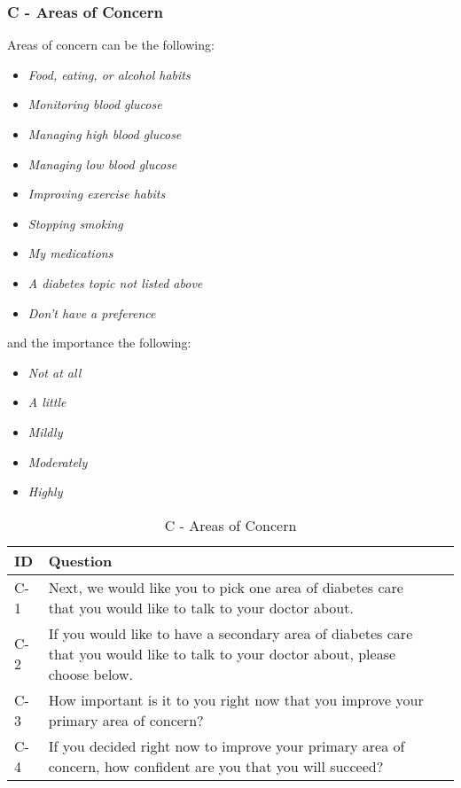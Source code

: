 \subsubsection{C - Areas of Concern}
Areas of concern can be the following:
\begin{itemize}
    \item \emph{Food, eating, or alcohol habits}
    \item \emph{Monitoring blood glucose}
    \item \emph{Managing high blood glucose}
    \item \emph{Managing low blood glucose}
    \item \emph{Improving exercise habits}
    \item \emph{Stopping smoking}
    \item \emph{My medications}
    \item \emph{A diabetes topic not listed above}
    \item \emph{Don't have a preference}
\end{itemize}
and the importance the following:
\begin{itemize}
    \item \emph{Not at all}
    \item \emph{A little}
    \item \emph{Mildly}
    \item \emph{Moderately}
    \item \emph{Highly}
\end{itemize}
\begin{table}[H]
    \centering
    \renewcommand{\arraystretch}{1.2}
    \begin{tabularx}{\textwidth}{|l|X|l|}
        \hline
        \textbf{ID} & \textbf{Question} \\ \hline
        C-1 & Next, we would like you to pick one area of diabetes care that you would like to talk to your doctor about. \\ \hline
        C-2 & If you would like to have a secondary area of diabetes care that you would like to talk to your doctor about, please choose below. \\ \hline
        C-3 & How important is it to you right now that you improve your primary area of concern? \\ \hline
        C-4 & If you decided right now to improve your primary area of concern, how confident are you that you will succeed? \\ \hline
    \end{tabularx}
    \caption{C - Areas of Concern}
    \label{tab:areas-of-concern}
\end{table}


